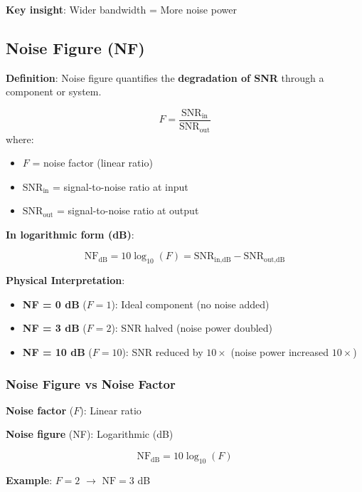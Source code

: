 \textbf{Key insight}: Wider bandwidth = More noise power

\subsection{Noise Figure (NF)}

\textbf{Definition}: Noise figure quantifies the \textbf{degradation of SNR} through a component or system.

\begin{equation}
F = \frac{\text{SNR}_{\text{in}}}{\text{SNR}_{\text{out}}}
\end{equation}
where:
\begin{itemize}
\item $F$ = noise factor (linear ratio)
\item $\text{SNR}_{\text{in}}$ = signal-to-noise ratio at input
\item $\text{SNR}_{\text{out}}$ = signal-to-noise ratio at output
\end{itemize}

\textbf{In logarithmic form (dB)}:

\begin{equation}
\text{NF}_{\text{dB}} = 10\log_{10}(F) = \text{SNR}_{\text{in,dB}} - \text{SNR}_{\text{out,dB}}
\end{equation}

\textbf{Physical Interpretation}:
\begin{itemize}
\item \textbf{NF = 0 dB} ($F = 1$): Ideal component (no noise added)
\item \textbf{NF = 3 dB} ($F = 2$): SNR halved (noise power doubled)
\item \textbf{NF = 10 dB} ($F = 10$): SNR reduced by $10\times$ (noise power increased $10\times$)
\end{itemize}

\subsubsection{Noise Figure vs Noise Factor}

\textbf{Noise factor} ($F$): Linear ratio

\textbf{Noise figure} (NF): Logarithmic (dB)

\begin{equation}
\text{NF}_{\text{dB}} = 10\log_{10}(F)
\end{equation}

\textbf{Example}: $F = 2$ $\rightarrow$ $\text{NF} = 3$ dB

